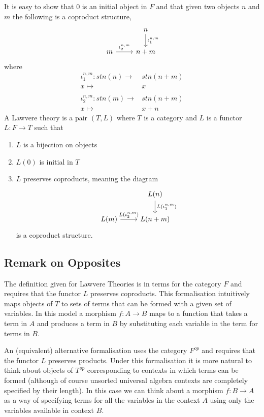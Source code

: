 \documentclass[12pt,a4paper,twoside,openright]{report}
\begin{document}
It is easy to show that $0$ is an initial object in $F$ and that given two
objects $n$ and $m$ the following is a coproduct structure,
\[
\begin{tikzcd}
    & n\arrow[d, "\iota_1^{n,m}"] \\
    m\arrow[r, "\iota_2^{n,m}"] & n+m
\end{tikzcd}
\]
where
\begin{align*}
    \iota_1^{n,m}:stn(n)\to& stn(n+m) \\
    x\mapsto&x \\
    \\
    \iota_2^{n,m}:stn(m)\to& stn(n+m) \\
    x\mapsto&x+n
\end{align*}
A Lawvere theory is a pair $(T, L)$ where $T$ is a category and $L$ is a functor
$L : F \to T$ such that
\begin{enumerate}
    \item $L$ is a bijection on objects
    \item $L(0)$ is initial in $T$
    \item $L$ preserves coproducts, meaning the diagram
    \[
    \begin{tikzcd}
        & L(n)\arrow[d, "L(\iota_1^{n,m})"] \\
        L(m)\arrow[r, "L(\iota_2^{n,m})"] & L(n+m)
    \end{tikzcd}
    \]
    is a coproduct structure.
\end{enumerate}

\subsection{Remark on Opposites}
The definition given for Lawvere Theories is in terms for the category $F$ and
requires that the functor $L$ preserves coproducts. This formalisation
intuitively maps objects of $T$ to sets of terms that can be formed with a given
set of variables. In this model a morphism $f:A\to B$ maps to a function that
takes a term in $A$ and produces a term in $B$ by substituting each variable in
the term for terms in $B$.

An (equivalent) alternative formalisation uses the category $F^{op}$ and
requires that the functor $L$ preserves products. Under this formalisation it
is more natural to think about objects of $T^{op}$ corresponding to contexts in
which terms can be formed (although of course unsorted universal algebra
contexts are completely specified by their length). In this case we can think
about a morphism $f:B\to A$ as a way of specifying terms for all the variables
in the context $A$ using only the variables available in context $B$. 
\end{document}
